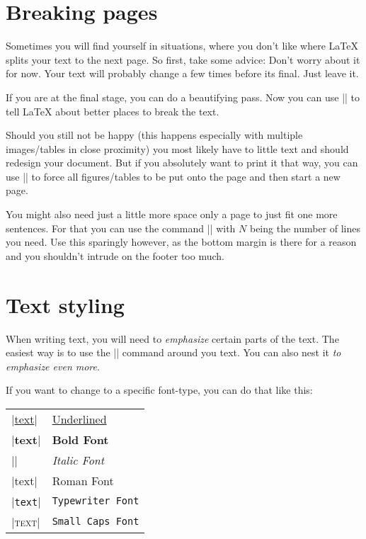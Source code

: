	\section{Breaking pages} \label{sec: pagebreak}
		Sometimes you will find yourself in situations, where you don't like where LaTeX splits your text to the next page. So first, take some
		advice: Don't worry about it for now. Your text will probably change a few times before its final. Just leave it.

		If you are at the final stage, you can do a beautifying pass. Now you can use |\pagebreak| to tell LaTeX about better places to
		break the text.

		Should you still not be happy (this happens especially with multiple images/tables in close proximity) you most likely have to little text and
		should redesign your document. But if you absolutely want to print it that way, you can use |\clearpage| to force all
		figures/tables to be put onto the page and then start a new page.

		\medskip
		You might also need just a little more space only a page to just fit one more sentences. For that you can use the command
		|\enlargethispage{N\baselineskip}| with $N$ being the number of lines you need. Use this sparingly however, as the bottom margin is
		there for a reason and you shouldn't intrude on the footer too much.


	\section{Text styling} \label{sec: styling}
		When writing text, you will need to \emph{emphasize} certain parts of the text. The easiest way is to use the |\emph{}| command
		around you text. You can also nest it \emph{to \emph{emphasize} even more}.

		If you want to change to a specific font-type, you can do that like this:

		\smallskip
		\begin{tabular}{l l}
			|\underline{text}| & \underline{Underlined} \\
			|\textbf{text}| & \textbf{Bold Font} \\
			|\textii{text}| & \textit{Italic Font} \\
			|\textrm{text}| & \textrm{Roman Font} \\
			|\texttt{text}| & \texttt{Typewriter Font} \\
			|\textsc{text}| & \texttt{Small Caps Font} \\
		\end{tabular}

